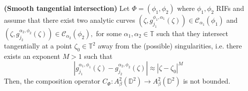 \documentclass[10pt,a4paper]{amsart}
\begin{document}
\begin{theorem}\textbf{(Smooth tangential intersection)} Let $\Phi=(\phi_1,\phi_2)$ where $\phi_1,\phi_2$ RIFs and assume that there exist two analytic curves $(\zeta,g_{j_1}^{\phi_1,\alpha_1}(\zeta))\in\mathcal{C}_{{\alpha}_1}(\phi_1)$ and $(\zeta,g^{\alpha_2,\phi_2}_{j_2}(\zeta))\in\mathcal{C}_{\alpha_2}(\phi_2),$ for some $\alpha_1,\alpha_2\in\mathbb{T}$ such that they intersect tangentially at a point $\zeta_0\in\mathbb{T}^2$ away from the (possible) singularities, i.e. there exists an exponent $M>1$ such that 
$$|g^{\alpha_1,\phi_1}_{j_1}(\zeta)-g_{j_2}^{\alpha_2,\phi_2}(\zeta)|\approx |\zeta-\zeta_0|^M$$
Then, the composition operator $C_{\Phi}:A^2_{\beta}(\mathbb{D}^2)\to A^2_{\beta}(\mathbb{D}^2)$ is not bounded. 
\end{theorem}
\end{document}
